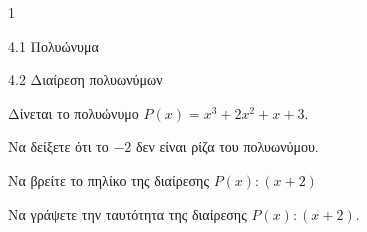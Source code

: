 \begin{ylh}{1}
\item 4.1 Πολυώνυμα
\item 4.2 Διαίρεση πολυωνύμων
\end{ylh}
Δίνεται το πολυώνυμο $P(x) = x^{3} + 2x^{2} + x + 3$.
\begin{alist}
\item Να δείξετε ότι το $- 2$ δεν είναι ρίζα του πολυωνύμου.
\item Να βρείτε το πηλίκο της διαίρεσης $P(x):(x + 2)$
\item Να γράψετε την ταυτότητα της διαίρεσης $P(x):(x + 2)$.
\end{alist}

